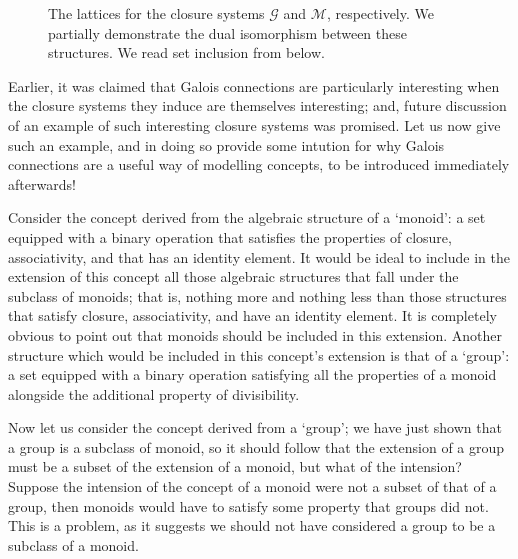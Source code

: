 \begin{figure}[H]
  \vspace{-6em}
  \caption{The lattices for the closure systems $\mathcal{G}$ and $\mathcal{M}$, respectively. We partially demonstrate the dual isomorphism between these structures. We read set inclusion from below.}
  \label{figure:two-lattices}
\end{figure}

Earlier, it was claimed that Galois connections are particularly interesting when the closure systems they induce are themselves interesting; and, future discussion of an example of such interesting closure
systems was promised. Let us now give such an example, and in doing so provide some intution for why Galois connections are a useful way of modelling concepts, to be introduced immediately afterwards!

Consider the concept derived from the algebraic structure of a `monoid': a set equipped with a binary operation that satisfies the properties of closure, associativity, and that has an identity element.
It would be ideal to include in the extension of this concept all those algebraic structures that fall under the subclass of monoids; that is, nothing more and nothing less than those structures that
satisfy closure, associativity, and have an identity element. It is completely obvious to point out that monoids should be included in this extension. Another structure which would be included in this
concept's extension is that of a `group': a set equipped with a binary operation satisfying all the properties of a monoid alongside the additional property of divisibility.

Now let us consider the concept derived from a `group'; we have just shown that a group is a subclass of monoid, so it should follow that the extension of a group must be a subset of the extension of a
monoid, but what of the intension? Suppose the intension of the concept of a monoid were not a subset of that of a group, then monoids would have to satisfy some property that groups did not. This is a
problem, as it suggests we should not have considered a group to be a subclass of a monoid.

